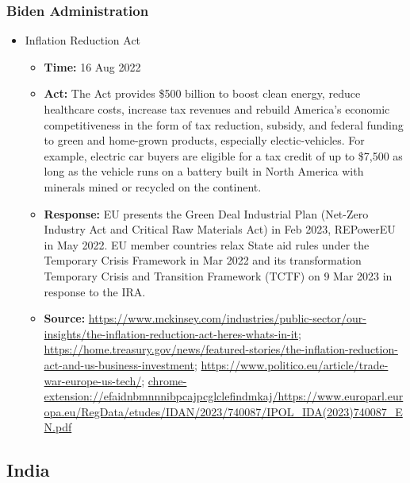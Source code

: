 		\subsubsection{Biden Administration}
			\begin{itemize}
			\item Inflation Reduction Act
				\begin{itemize}
				\item \textbf{Time: } 16 Aug 2022
				\item \textbf{Act: } The Act provides \$500 billion to boost clean energy, reduce healthcare costs, increase tax revenues and rebuild America's economic competitiveness in the form of tax reduction, subsidy, and federal funding to green and home-grown products, especially electic-vehicles. For example, electric car buyers are eligible for a tax credit of up to \$7,500 as long as the vehicle runs on a battery built in North America with minerals mined or recycled on the continent.
				\item \textbf{Response: } EU presents the Green Deal Industrial Plan (Net-Zero Industry Act and Critical Raw Materials Act) in Feb 2023, REPowerEU in May 2022. EU member countries relax State aid rules under the Temporary Crisis Framework in Mar 2022 and its transformation Temporary Crisis and Transition Framework (TCTF) on 9 Mar 2023 in response to the IRA.
				\item	\textbf{Source: }\url{https://www.mckinsey.com/industries/public-sector/our-insights/the-inflation-reduction-act-heres-whats-in-it}; \url{https://home.treasury.gov/news/featured-stories/the-inflation-reduction-act-and-us-business-investment}; \url{https://www.politico.eu/article/trade-war-europe-us-tech/}; \url{chrome-extension://efaidnbmnnnibpcajpcglclefindmkaj/https://www.europarl.europa.eu/RegData/etudes/IDAN/2023/740087/IPOL_IDA(2023)740087_EN.pdf}
				\end{itemize}
			\end{itemize}
			
	\subsection{India}
